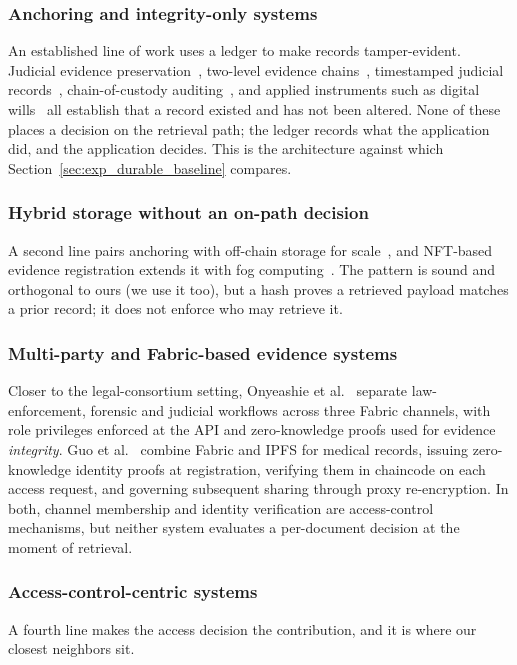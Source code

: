 \documentclass[preprint,12pt]{elsarticle}
\begin{document}
\subsubsection{Anchoring and integrity-only systems}
An established line of work uses a ledger to make records tamper-evident.
Judicial evidence preservation~\cite{liu2024blockchain}, two-level evidence
chains~\cite{twoLevelBlockchain}, timestamped judicial
records~\cite{verma2021nyaya}, chain-of-custody
auditing~\cite{hanafi2021ipfschain}, and applied instruments such as digital
wills~\cite{hernando2025wills} all establish that a record existed and has not
been altered. None of these places a decision on the retrieval path; the ledger records
what the application did, and the application decides. This is the architecture
against which Section~\ref{sec:exp_durable_baseline} compares.

\subsubsection{Hybrid storage without an on-path decision}
A second line pairs anchoring with off-chain storage for
scale~\cite{liu2024blockchain,jlil2024blockchain}, and NFT-based evidence
registration extends it with fog computing~\cite{peelam2026decentralized}. The
pattern is sound and orthogonal to ours (we use it too), but a hash proves
a retrieved payload matches a prior record; it does not enforce who may
retrieve it.

\subsubsection{Multi-party and Fabric-based evidence systems}
Closer to the legal-consortium setting, Onyeashie et
al.~\cite{onyeashie2025fabricEvidence} separate law-enforcement, forensic and
judicial workflows across three Fabric channels, with role privileges enforced
at the API and zero-knowledge proofs used for evidence \emph{integrity}. Guo et
al.~\cite{guo2024efficient} combine Fabric and IPFS for medical records,
issuing zero-knowledge identity proofs at registration, verifying them in
chaincode on each access request,
and governing subsequent sharing through proxy re-encryption. In both,
channel membership and identity verification are access-control mechanisms,
but neither system evaluates a per-document decision at the moment of
retrieval.

\subsubsection{Access-control-centric systems}
\label{sec:acl_systems}
A fourth line makes the access decision the contribution, and it is where our
closest neighbors sit.
\end{document}
